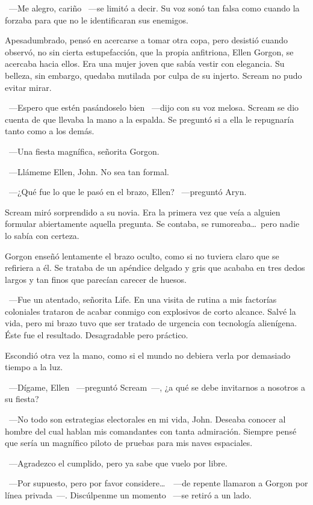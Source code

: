 ~---Me alegro, cariño ~---se limitó a decir. Su voz sonó tan falsa como cuando la forzaba para que no le identificaran sus enemigos.

Apesadumbrado, pensó en acercarse a tomar otra copa, pero desistió cuando observó, no sin cierta estupefacción, que la propia anfitriona, Ellen Gorgon, se acercaba hacia ellos. Era una mujer joven que sabía vestir con elegancia. Su belleza, sin embargo, quedaba mutilada por culpa de su injerto. Scream no pudo evitar mirar.

~---Espero que estén pasándoselo bien ~---dijo con su voz melosa. Scream se dio cuenta de que llevaba la mano a la espalda. Se preguntó si a ella le repugnaría tanto como a los demás.

~---Una fiesta magnífica, señorita Gorgon.

~---Llámeme Ellen, John. No sea tan formal.

~---¿Qué fue lo que le pasó en el brazo, Ellen? ~---preguntó Aryn.

Scream miró sorprendido a su novia. Era la primera vez que veía a alguien formular abiertamente aquella pregunta. Se contaba, se rumoreaba\dots\ pero nadie lo sabía con certeza.

Gorgon enseñó lentamente el brazo oculto, como si no tuviera claro que se refiriera a él. Se trataba de un apéndice delgado y gris que acababa en tres dedos largos y tan finos que parecían carecer de huesos.

~---Fue un atentado, señorita Life. En una visita de rutina a mis factorías coloniales trataron de acabar conmigo con explosivos de corto alcance. Salvé la vida, pero mi brazo tuvo que ser tratado de urgencia con tecnología alienígena. Éste fue el resultado. Desagradable pero práctico.

Escondió otra vez la mano, como si el mundo no debiera verla por demasiado tiempo a la luz.

~---Dígame, Ellen ~---preguntó Scream~---, ¿a qué se debe invitarnos a nosotros a su fiesta?

~---No todo son estrategias electorales en mi vida, John. Deseaba conocer al hombre del cual hablan mis comandantes con tanta admiración. Siempre pensé que sería un magnífico piloto de pruebas para mis naves espaciales.

~---Agradezco el cumplido, pero ya sabe que vuelo por libre.

~---Por supuesto, pero por favor considere\dots\ ~---de repente llamaron a Gorgon por línea privada~---. Discúlpenme un momento ~---se retiró a un lado.

